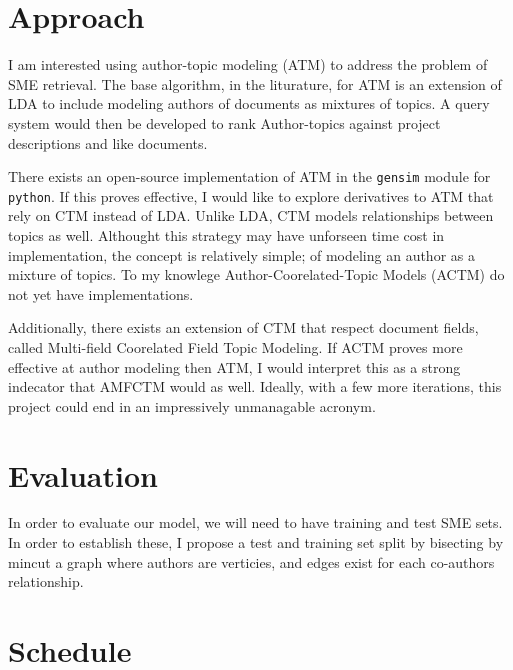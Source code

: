 \documentclass{article}
\begin{document}
\begin{multicols}{2}
\section{Approach}

I am interested using author-topic\cite{Rosen-Zvi2004} modeling (ATM) to address the
problem of SME retrieval. The base algorithm, in the liturature, for ATM is an
extension of LDA to include modeling authors of documents as mixtures of topics. A
query system would then be developed to rank Author-topics against project
descriptions and like documents.

There exists an open-source implementation of ATM in the \texttt{gensim}\cite{rehurek_lrec}
module for \texttt{python}. If this proves effective, I would like to explore
derivatives to ATM that rely on CTM instead of LDA. Unlike LDA, CTM models
relationships between topics as well. Althought this strategy may have unforseen time
cost in implementation, the concept is relatively simple; of modeling an author as a
mixture of topics. To my knowlege Author-Coorelated-Topic Models (ACTM) do not yet
have implementations.

Additionally, there exists an extension of CTM that respect document fields, called
Multi-field Coorelated Field Topic Modeling\cite{Salomatin2009MultifieldCT}. If ACTM
proves more effective at author modeling then ATM, I would interpret this as a strong
indecator that AMFCTM would as well. Ideally, with a few more iterations, this
project could end in an impressively unmanagable acronym.


\section{Evaluation}

In order to evaluate our model, we will need to have training and test SME sets. In
order to establish these, I propose a test and training set split by bisecting by
mincut\cite{Feige2002} a graph where authors are verticies, and edges exist for each
co-authors relationship.

\section{Schedule}


\begin{comment}


\end{comment}
\end{multicols}
\end{document}
